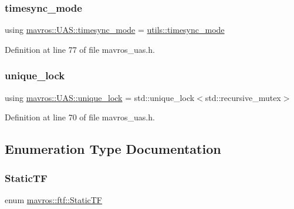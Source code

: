 \mbox{\label{group__nodelib_ga866822300d407c623943a069e0db494a}} 
\subsubsection{\texorpdfstring{timesync\_mode}{timesync\_mode}}
{\footnotesize\ttfamily using \mbox{\hyperlink{group__mavutils_gac7f53712a7627f397d0eb145c2a16cf7}{mavros\+::\+U\+A\+S\+::timesync\+\_\+mode}} =  \mbox{\hyperlink{group__mavutils_gac7f53712a7627f397d0eb145c2a16cf7}{utils\+::timesync\+\_\+mode}}}



Definition at line 77 of file mavros\+\_\+uas.\+h.

\mbox{\label{group__nodelib_ga8452368668995b87dd0cd51d4193c9ad}} 
\subsubsection{\texorpdfstring{unique\_lock}{unique\_lock}}
{\footnotesize\ttfamily using \mbox{\hyperlink{group__nodelib_ga8452368668995b87dd0cd51d4193c9ad}{mavros\+::\+U\+A\+S\+::unique\+\_\+lock}} =  std\+::unique\+\_\+lock$<$std\+::recursive\+\_\+mutex$>$}



Definition at line 70 of file mavros\+\_\+uas.\+h.



\subsection{Enumeration Type Documentation}
\mbox{\label{group__nodelib_gacff0983128574bbbe115917b13e57a63}} 
\subsubsection{\texorpdfstring{StaticTF}{StaticTF}}
{\footnotesize\ttfamily enum \mbox{\hyperlink{group__nodelib_gacff0983128574bbbe115917b13e57a63}{mavros\+::ftf\+::\+Static\+TF}}\hspace{0.3cm}{\ttfamily [strong]}}



